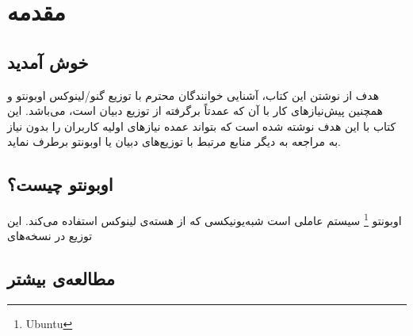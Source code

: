 \chapter{مقدمه}
\section{خوش آمدید}
هدف از نوشتن این کتاب، آشنایی خوانندگان محترم با توزیع گنو/لینوکس اوبونتو و همچنین پیش‌نیازهای کار با آن که عمدتاً برگرفته از توزیع دبیان است، می‌باشد. این کتاب با این هدف نوشته شده است که بتواند عمده نیازهای اولیه کاربران را بدون نیاز به مراجعه به دیگر منابع مرتبط با توزیع‌‌های دبیان یا اوبونتو برطرف نماید.
\section{اوبونتو چیست؟}
اوبونتو
\footnote{Ubuntu}
سیستم عاملی است شبه‌یونیکسی که از هسته‌ی لینوکس استفاده می‌کند. این توزیع در نسخه‌های 
 \section{مطالعه‌ی بیشتر}